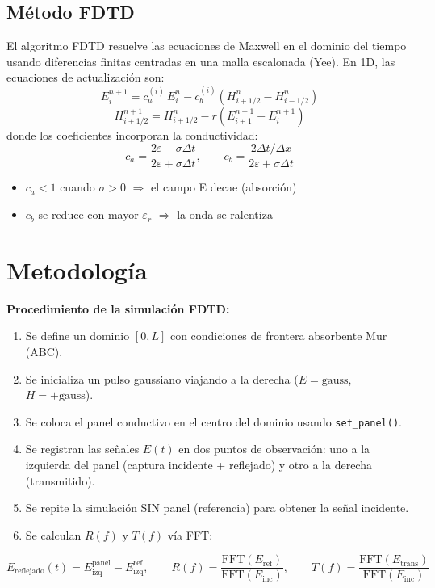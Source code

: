 \documentclass[11pt,a4paper]{article}
\begin{document}
\subsection{M\'etodo FDTD}

El algoritmo FDTD resuelve las ecuaciones de Maxwell en el dominio del tiempo usando diferencias finitas centradas en una malla escalonada (Yee). En 1D, las ecuaciones de actualizaci\'on son:
\[
E^{n+1}_i = c_a^{(i)} \, E^n_i - c_b^{(i)} \left(H^n_{i+1/2} - H^n_{i-1/2}\right)
\]
\[
H^{n+1}_{i+1/2} = H^n_{i+1/2} - r \left(E^{n+1}_{i+1} - E^{n+1}_i\right)
\]
donde los coeficientes incorporan la conductividad:
\[
c_a = \frac{2\varepsilon - \sigma\Delta t}{2\varepsilon + \sigma\Delta t}, \qquad
c_b = \frac{2\Delta t/\Delta x}{2\varepsilon + \sigma\Delta t}
\]

\begin{itemize}
  \item $c_a < 1$ cuando $\sigma > 0$ $\Rightarrow$ el campo E decae (absorci\'on)
  \item $c_b$ se reduce con mayor $\varepsilon_r$ $\Rightarrow$ la onda se ralentiza
\end{itemize}

\section{Metodolog\'ia}

\textbf{Procedimiento de la simulaci\'on FDTD:}
\begin{enumerate}
  \item Se define un dominio $[0, L]$ con condiciones de frontera absorbente Mur (ABC).
  \item Se inicializa un pulso gaussiano viajando a la derecha ($E = \text{gauss}$, $H = +\text{gauss}$).
  \item Se coloca el panel conductivo en el centro del dominio usando \texttt{set\_panel()}.
  \item Se registran las se\~nales $E(t)$ en dos puntos de observaci\'on: uno a la izquierda del panel (captura incidente + reflejado) y otro a la derecha (transmitido).
  \item Se repite la simulaci\'on SIN panel (referencia) para obtener la se\~nal incidente.
  \item Se calculan $R(f)$ y $T(f)$ v\'ia FFT:
\end{enumerate}
\[
E_{\text{reflejado}}(t) = E_{\text{izq}}^{\text{panel}} - E_{\text{izq}}^{\text{ref}}, \qquad
R(f) = \frac{\text{FFT}(E_{\text{ref}})}{\text{FFT}(E_{\text{inc}})}, \qquad
T(f) = \frac{\text{FFT}(E_{\text{trans}})}{\text{FFT}(E_{\text{inc}})}
\]
\end{document}
